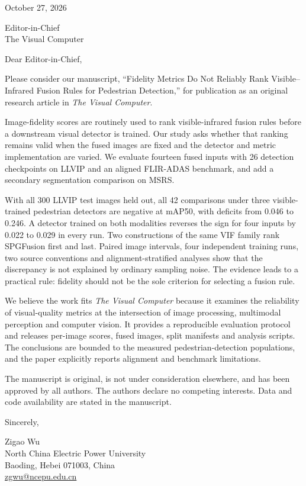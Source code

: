 \documentclass[11pt,a4paper]{article}
\begin{document}
October 27, 2026

Editor-in-Chief\\
The Visual Computer

Dear Editor-in-Chief,

Please consider our manuscript, ``Fidelity Metrics Do Not Reliably Rank
Visible--Infrared Fusion Rules for Pedestrian Detection,'' for publication as an
original research article in \emph{The Visual Computer}.

Image-fidelity scores are routinely used to rank visible-infrared fusion rules
before a downstream visual detector is trained. Our study asks whether that ranking
remains valid when the fused images are fixed and the detector and metric
implementation are varied. We evaluate fourteen fused inputs with 26 detection
checkpoints on LLVIP and an aligned FLIR-ADAS benchmark, and add a secondary
segmentation comparison on MSRS.

With all 300 LLVIP test images held out, all 42 comparisons under three
visible-trained pedestrian detectors are negative at mAP50, with deficits from
0.046 to 0.246. A detector trained on both modalities reverses the sign for four
inputs by 0.022 to 0.029 in every run. Two constructions of the same VIF family rank
SPGFusion first and last. Paired image intervals, four independent training runs,
two source conventions and alignment-stratified analyses show that the discrepancy
is not explained by ordinary sampling noise. The evidence leads to a practical rule:
fidelity should not be the sole criterion for selecting a fusion rule.

We believe the work fits \emph{The Visual Computer} because it examines the
reliability of visual-quality metrics at the intersection of image processing,
multimodal perception and computer vision. It provides a reproducible evaluation
protocol and releases per-image scores, fused images, split manifests and analysis
scripts. The conclusions are bounded to the measured pedestrian-detection
populations, and the paper explicitly reports alignment and benchmark limitations.

The manuscript is original, is not under consideration elsewhere, and has been
approved by all authors. The authors declare no competing interests. Data and code
availability are stated in the manuscript.

Sincerely,

Zigao Wu\\
North China Electric Power University\\
Baoding, Hebei 071003, China\\
\href{mailto:zgwu@ncepu.edu.cn}{zgwu@ncepu.edu.cn}
\end{document}
